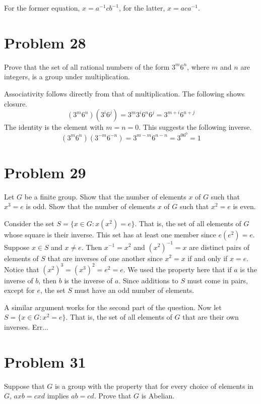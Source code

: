 \documentclass{article}
\begin{document}
For the former equation, $x=a^{-1}cb^{-1}$, for the latter, $x=aca^{-1}$.

\section*{Problem 28}

Prove that the set of all rational numbers of the form $3^m6^n$, where $m$ and $n$
are integers, is a group under multiplication.

Associativity follows directly from that of multiplication.  The following shows closure.
\begin{equation*}
(3^m6^n)(3^i6^j) = 3^m3^i6^n6^j = 3^{m+i}6^{n+j}
\end{equation*}
The identity is the element with $m=n=0$.  This suggests the following inverse.
\begin{equation*}
(3^m6^n)(3^{-m}6^{-n}) = 3^{m-m}6^{n-n} = 3^06^0 = 1
\end{equation*}

\section*{Problem 29}

Let $G$ be a finite group.  Show that the number of elements $x$ of $G$ such
that $x^3=e$ is odd.  Show that the number of elements $x$ of $G$ such that
$x^2=e$ is even.

Consider the set $S=\{x\in G:x(x^2)=e\}$.  That is, the set of all elements
of $G$ whose square is their inverse.  This set has at least one member since
$e(e^2)=e$.  Suppose $x\in S$ and $x\neq e$.  Then $x^{-1}=x^2$ and
$(x^2)^{-1}=x$ are distinct pairs of elements of $S$ that are inverses of one
another since $x^2=x$ if and only if $x=e$.  Notice that $(x^2)^3=(x^3)^2=e^2=e$.
We used the property here that if $a$ is the inverse of $b$, then $b$ is the
inverse of $a$.  Since additions to $S$ must come in pairs, except for $e$, the
set $S$ must have an odd number of elements.

A similar argument works for the second part of the question.  Now let
$S=\{x\in G:x^2=e\}$.  That is, the set of all elements of $G$ that are
their own inverses.  Err...

\section*{Problem 31}

Suppose that $G$ is a group with the property that for every choice of elements in $G$,
$axb=cxd$ implies $ab=cd$.  Prove that $G$ is Abelian.
\end{document}

